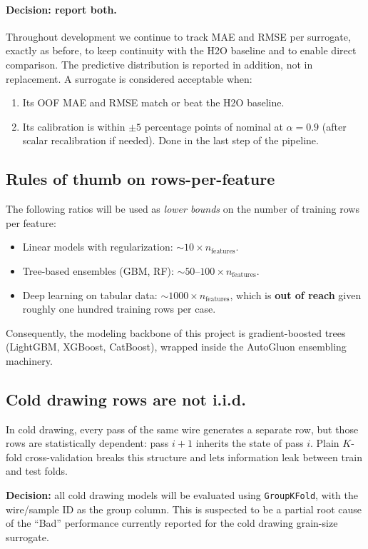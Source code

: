 \documentclass[11pt,a4paper]{article}
\begin{document}
\paragraph{Decision: report both.} Throughout development we continue to
track MAE and RMSE per surrogate, exactly as before, to keep continuity
with the H2O baseline and to enable direct comparison. The predictive
distribution is reported in addition, not in replacement. A surrogate is
considered acceptable when:

\begin{enumerate}
    \item Its OOF MAE and RMSE match or beat the H2O baseline.
    \item Its calibration is within $\pm 5$ percentage points of nominal
    at $\alpha = 0.9$ (after scalar recalibration if needed). Done in the last step of the pipeline.
\end{enumerate}

\subsection{Rules of thumb on rows-per-feature}

\begin{decisionbox}
The following ratios will be used as \emph{lower bounds} on the number of training rows per feature:
\begin{itemize}
    \item Linear models with regularization: $\sim 10 \times n_{\text{features}}$.
    \item Tree-based ensembles (GBM, RF): $\sim 50\text{--}100 \times n_{\text{features}}$.
    \item Deep learning on tabular data: $\sim 1000 \times n_{\text{features}}$, which is \textbf{out of reach} given roughly one hundred training rows per case.
\end{itemize}
Consequently, the modeling backbone of this project is gradient-boosted trees (LightGBM, XGBoost, CatBoost), wrapped inside the AutoGluon ensembling machinery.
\end{decisionbox}

\subsection{Cold drawing rows are not i.i.d.}

\begin{cautionbox}
In cold drawing, every pass of the same wire generates a separate row, but those rows are statistically dependent: pass $i+1$ inherits the state of pass $i$. Plain $K$-fold cross-validation breaks this structure and lets information leak between train and test folds.

\textbf{Decision:} all cold drawing models will be evaluated using \texttt{GroupKFold}, with the wire/sample ID as the group column. This is suspected to be a partial root cause of the ``Bad'' performance currently reported for the cold drawing grain-size surrogate.
\end{cautionbox}
\end{document}
